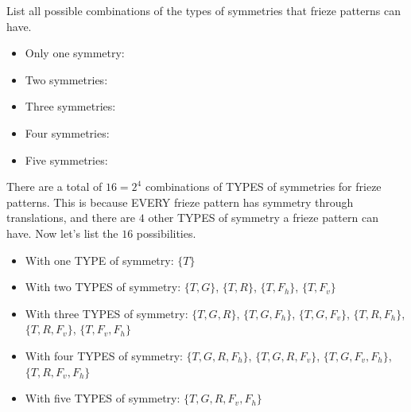 \documentclass[noauthor,nooutcomes,hints,handout]{../ximera}
\begin{document}


\begin{question}
  List all possible combinations of the types of symmetries that
  frieze patterns can have. 
  
\begin{itemize}
 \item Only one symmetry:
 \item Two symmetries:
 \item Three symmetries:
 \item Four symmetries:
 \item Five symmetries:
\end{itemize}
  \begin{freeResponse}
    There are a total of $16 = 2^4$ combinations of TYPES of
    symmetries for frieze patterns. This is because EVERY frieze
    pattern has symmetry through translations, and there are $4$ other
    TYPES of symmetry a frieze pattern can have.  Now let's list the
    $16$ possibilities.
    \begin{itemize}
    \item With one TYPE of symmetry: $\{T\}$
    \item With two TYPES of symmetry: $\{T,G\}$, $\{T,R\}$, $\{T,F_h\}$, $\{T,F_v\}$
    \item With three TYPES of symmetry: $\{T,G,R\}$, $\{T,G,F_h\}$, $\{T,G,F_v\}$, $\{T,R,F_h\}$, $\{T,R,F_v\}$, $\{T,F_v,F_h\}$
    \item With four TYPES of symmetry:  $\{T,G,R,F_h\}$, $\{T,G,R,F_v\}$, $\{T,G,F_v,F_h\}$, $\{T,R,F_v,F_h\}$
    \item With five TYPES of symmetry: $\{T,G,R,F_v,F_h\}$
    \end{itemize}
  \end{freeResponse}
\end{question}
\mynewpage
\end{document}
